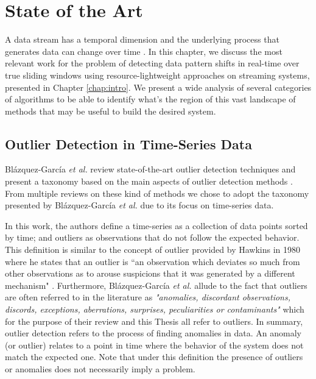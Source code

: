 \chapter{State of the Art} \label{chap:sota} \minitoc

A data stream has a temporal dimension and the underlying process that generates data can change over time \cite{Aggarwal-Evolving-Data-Streams, Domingos-Mining-Time-Data-Streams}. In this chapter, we discuss the most relevant work for the problem of detecting data pattern shifts in real-time over true sliding windows using resource-lightweight approaches on streaming systems, presented in Chapter \ref{chap:intro}. We present a wide analysis of several categories of algorithms to be able to identify what's the region of this vast landscape of methods that may be useful to build the desired system. 

\section{Outlier Detection in Time-Series Data} \label{sec:outliers}
Blázquez-García \emph{et al.} review state-of-the-art outlier detection techniques and present a taxonomy based on the main aspects of outlier detection methods \cite{Blazquez-Garcia-Review-Anomaly-Detection}. From multiple reviews on these kind of methods \cite{Aggarwal-Outlier-survey, Aguinis-Outlier-survey, Chandola-Outlier-survey-2009, Hodge-Outlier-survey, Xu-outlier-survey-2019} we chose to adopt the taxonomy presented by Blázquez-García \emph{et al.} due to its focus on time-series data.

In this work, the authors define a time-series as a collection of data points sorted by time; and outliers as observations that do not follow the expected behavior. This definition is similar to the concept of outlier provided by Hawkins in 1980 where he states that an outlier is “an observation which deviates so much from other observations as to arouse suspicions that it was
generated by a different mechanism" \cite{Hawkins-Outliers}. Furthermore, Blázquez-García \emph{et al.} allude to the fact that outliers are often referred to in the literature as \textit{"anomalies, discordant observations, discords, exceptions, aberrations, surprises, peculiarities or contaminants"} which for the purpose of their review and this Thesis all refer to outliers. In summary, outlier detection refers to the process of finding anomalies in data. An anomaly (or outlier) relates to a point in time where the behavior of the system does not match the expected one. Note that under this definition the presence of outliers or anomalies does not necessarily imply a problem. 

